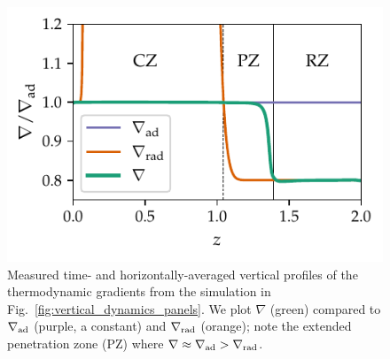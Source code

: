 \documentclass[twocolumn]{aastex631}
\newcommand{\gradrad}{\ensuremath{\nabla_{\rm{rad}}}}
\newcommand{\gradad}{\ensuremath{\nabla_{\rm{ad}}}}
\newcommand{\justgrad}{\ensuremath{\nabla}}
\begin{document}
\begin{figure}[t]
\centering
\includegraphics[width=\columnwidth]{grad_profiles.pdf}
\caption{
Measured time- and horizontally-averaged vertical profiles of the thermodynamic gradients from the simulation in Fig.~\ref{fig:vertical_dynamics_panels}.
We plot $\justgrad$ (green) compared to $\gradad$ (purple, a constant) and $\gradrad$ (orange); note the extended penetration zone (PZ) where $\justgrad \approx \gradad > \gradrad$.
\label{fig:grad_profiles}
}
\end{figure}
\end{document}
